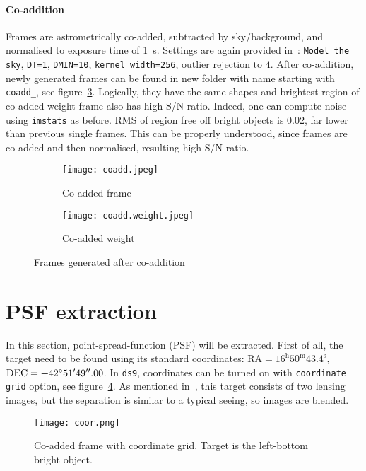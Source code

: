 \paragraph{Co-addition} 
Frames are astrometrically co-added, subtracted by sky/background, and normalised to exposure time of \SI{1}{\second}.  Settings are again provided in~\cite{manual}: \verb|Model the sky|, \verb|DT=1|, \verb|DMIN=10|, \verb|kernel width=256|, outlier rejection to $4$. After co-addition, newly generated frames can be found in new folder with name starting with \verb|coadd_|, see figure~\ref{fig:coadds}. Logically, they have the same shapes and brightest region of co-added weight frame also has high S/N ratio. Indeed, one can compute noise using \verb|imstats| as before. RMS of region free off bright objects is \num{0.02}, far lower than previous single frames. This can be properly understood, since frames are co-added and then normalised, resulting high S/N ratio.
\begin{figure}[h]
   \centering
   \begin{subfigure}[t]{0.8\textwidth}
   \begin{center}
   \texttt{[image: coadd.jpeg]}
   \end{center}
   \caption{Co-added frame}
   \label{fig:coadd}
   \end{subfigure}
   \begin{subfigure}[t]{0.8\textwidth}
   \begin{center}
   \texttt{[image: coadd.weight.jpeg]}
   \end{center}
   \caption{Co-added weight}
   \label{fig:coadd-weight}
   \end{subfigure}
   \caption{Frames generated after co-addition}%
   \label{fig:coadds}
\end{figure}

\clearpage
\section{PSF extraction}
In this section, point-spread-function (PSF) will be extracted. First of all, the target need to be found using its standard coordinates: $\text{RA} = 16^\text{h}50^\text{m}43.4^\text{s}$, $\text{DEC}=+42\degree 51'49''.00$. In \verb|ds9|, coordinates can be turned on with \verb|coordinate grid| option, see figure~\ref{fig:coor-grid}. As mentioned in~\cite{manual}, this target consists of two lensing images, but the separation is similar to a typical seeing, so images are blended.
\begin{figure}[ht]
   \centering
   \texttt{[image: coor.png]}
   \caption{Co-added frame with coordinate grid. Target is the left-bottom bright object.}%
   \label{fig:coor-grid}
\end{figure}

